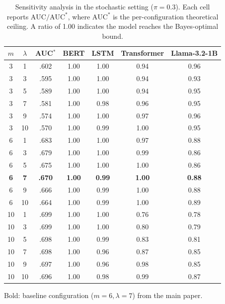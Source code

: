 \documentclass{article} %
\theoremstyle{plain}
\theoremstyle{definition}
\theoremstyle{remark}
\begin{document}
\begin{table}[t]
  \centering
  \caption{Sensitivity analysis in the stochastic setting ($\pi=0.3$). Each cell reports $\text{AUC}/\text{AUC}^*$, where $\text{AUC}^*$ is the            
  per-configuration theoretical ceiling. A ratio of 1.00 indicates the model reaches the Bayes-optimal bound.}
  \label{tab:sensitivity}
  \small
  \begin{tabular}{cc c cccc}
  \toprule                                                                    
  $m$ & $\lambda$ & AUC$^*$ & BERT & LSTM & Transformer & Llama-3.2-1B \\
  \midrule                             
  3  & 1  & .602 & 1.00 & 1.00 & 0.94 & 0.96 \\
  3  & 3  & .595 & 1.00 & 1.00 & 0.94 & 0.93 \\                              
  3  & 5  & .589 & 1.00 & 1.00 & 0.94 & 0.95 \\                             
  3  & 7  & .581 & 1.00 & 0.98 & 0.96 & 0.95 \\
  3  & 9  & .574 & 1.00 & 1.00 & 0.97 & 0.96 \\
  3  & 10 & .570 & 1.00 & 0.99 & 1.00 & 0.95 \\
  \midrule
  6  & 1  & .683 & 1.00 & 1.00 & 0.97 & 0.88 \\
  6  & 3  & .679 & 1.00 & 1.00 & 0.99 & 0.86 \\                    
  6  & 5  & .675 & 1.00 & 1.00 & 1.00 & 0.86 \\
  \textbf{6}  & \textbf{7}  & \textbf{.670} & \textbf{1.00} & \textbf{0.99} & \textbf{1.00} & \textbf{0.88} \\
  6  & 9  & .666 & 1.00 & 0.99 & 1.00 & 0.88 \\
  6  & 10 & .664 & 1.00 & 0.99 & 1.00 & 0.89 \\                           
  \midrule        
  10 & 1  & .699 & 1.00 & 1.00 & 0.76 & 0.78 \\
  10 & 3  & .699 & 1.00 & 1.00 & 0.80 & 0.79 \\
  10 & 5  & .698 & 1.00 & 0.99 & 0.83 & 0.81 \\
  10 & 7  & .698 & 1.00 & 0.96 & 0.87 & 0.85 \\
  10 & 9  & .697 & 1.00 & 0.96 & 0.98 & 0.85 \\                             
  10 & 10 & .696 & 1.00 & 0.98 & 0.99 & 0.87 \\
  \bottomrule
  \end{tabular}

  \parbox{\textwidth}{\raggedright\footnotesize
    \vspace{3pt} %
    Bold: baseline configuration ($m{=}6, \lambda{=}7$) from the main paper.
  }
\end{table}
\end{document}
